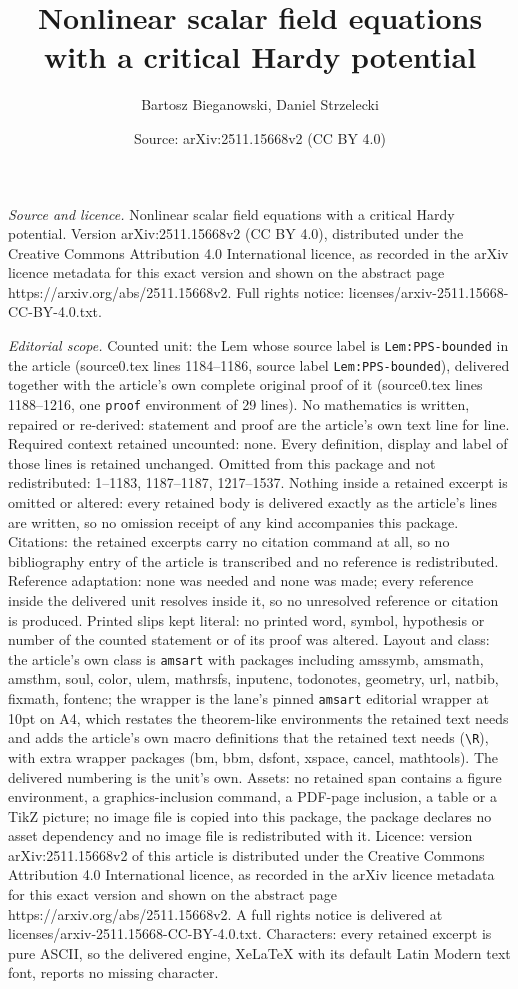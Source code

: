 \documentclass[10pt,a4paper]{amsart}
\title[Nonlinear scalar field equations with a critical Hardy poten]{Nonlinear scalar field equations with a critical Hardy potential}
\author{Bartosz Bieganowski, Daniel Strzelecki}
\date{Source: arXiv:2511.15668v2 (CC BY 4.0)}
\begin{document}
\maketitle

\noindent\emph{Source and licence.} Nonlinear scalar field equations with a critical Hardy potential. Version arXiv:2511.15668v2 (CC BY 4.0), distributed under the Creative Commons Attribution 4.0 International licence, as recorded in the arXiv licence metadata for this exact version and shown on the abstract page https://arxiv.org/abs/2511.15668v2. Full rights notice: licenses/arxiv-2511.15668-CC-BY-4.0.txt.\par\smallskip

\noindent\textit{Editorial scope.} Counted unit: the Lem whose source label is \texttt{Lem:PPS-bounded} in the article (source0.tex lines 1184--1186, source label \texttt{Lem:PPS-bounded}), delivered together with the article's own complete original proof of it (source0.tex lines 1188--1216, one \texttt{proof} environment of 29 lines). No mathematics is written, repaired or re-derived: statement and proof are the article's own text line for line. Required context retained uncounted: none. Every definition, display and label of those lines is retained unchanged. Omitted from this package and not redistributed: 1--1183, 1187--1187, 1217--1537. Nothing inside a retained excerpt is omitted or altered: every retained body is delivered exactly as the article's lines are written, so no omission receipt of any kind accompanies this package. Citations: the retained excerpts carry no citation command at all, so no bibliography entry of the article is transcribed and no reference is redistributed. Reference adaptation: none was needed and none was made; every reference inside the delivered unit resolves inside it, so no unresolved reference or citation is produced. Printed slips kept literal: no printed word, symbol, hypothesis or number of the counted statement or of its proof was altered. Layout and class: the article's own class is \texttt{amsart} with packages including amssymb, amsmath, amsthm, soul, color, ulem, mathrsfs, inputenc, todonotes, geometry, url, natbib, fixmath, fontenc; the wrapper is the lane's pinned \texttt{amsart} editorial wrapper at 10pt on A4, which restates the theorem-like environments the retained text needs and adds the article's own macro definitions that the retained text needs (\texttt{\textbackslash R}), with extra wrapper packages (bm, bbm, dsfont, xspace, cancel, mathtools). The delivered numbering is the unit's own. Assets: no retained span contains a figure environment, a graphics-inclusion command, a PDF-page inclusion, a table or a TikZ picture; no image file is copied into this package, the package declares no asset dependency and no image file is redistributed with it. Licence: version arXiv:2511.15668v2 of this article is distributed under the Creative Commons Attribution 4.0 International licence, as recorded in the arXiv licence metadata for this exact version and shown on the abstract page https://arxiv.org/abs/2511.15668v2. A full rights notice is delivered at licenses/arxiv-2511.15668-CC-BY-4.0.txt. Characters: every retained excerpt is pure ASCII, so the delivered engine, XeLaTeX with its default Latin Modern text font, reports no missing character.
\end{document}
